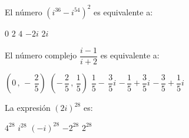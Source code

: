 \documentclass[]{srs}
\begin{document}
\begin{preguntas}[after-item-skip=2cm]
\pregunta El número $(i^{36}-i^{54})^2$ es equivalente a:\\
\begin{vertical}
  \alternativa $0$
  \alternativa $2$
  \alternativa $4$
  \alternativa $-2i$
  \alternativa $2i$
\end{vertical}

\pregunta El número complejo $\dfrac{i-1}{i+2}$ es equivalente a:\\
\begin{vertical}
  \alternativa $\left(0\,,\,-\,\dfrac{2}{5}\right)$
  \alternativa $\left(-\,\dfrac{2}{5}\,,\,\dfrac{1}{5}\right)$
  \alternativa $\dfrac{1}{5}-\,\dfrac{3}{5}i$
  \alternativa $-\,\dfrac{1}{5}+\dfrac{3}{5}i$
  \alternativa $-\,\dfrac{3}{5}+\dfrac{1}{5}i$
\end{vertical}

\pregunta La expresión $(2i)^{28}$ es:\\
\begin{vertical}
  \alternativa $4^{28}$
  \alternativa $i^{28}$
  \alternativa $(-i)^{28}$
  \alternativa $-2^{28}$
  \alternativa $2^{28}$
\end{vertical}

\end{preguntas}
\end{document}

